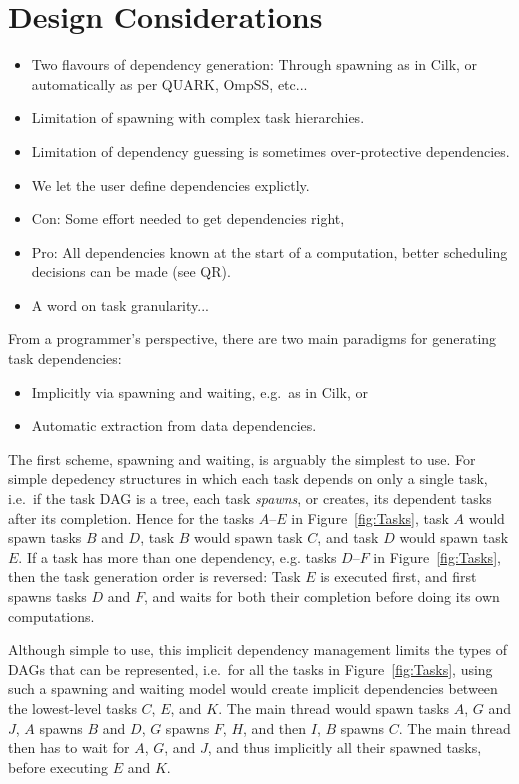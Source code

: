 \documentclass[preprint]{elsarticle}
\newcommand{\fig}[1]
    {Figure~\ref{fig:#1}}
\begin{document}
\section{Design Considerations}

\begin{itemize}
  \item Two flavours of dependency generation: Through spawning as in Cilk,
    or automatically as per QUARK, OmpSS, etc...
  \item Limitation of spawning with complex task hierarchies.
  \item Limitation of dependency guessing is sometimes over-protective dependencies.
  \item We let the user define dependencies explictly.
  \item Con: Some effort needed to get dependencies right,
  \item Pro: All dependencies known at the start of a computation, better
    scheduling decisions can be made (see QR).
  \item A word on task granularity...
\end{itemize}

From a programmer's perspective, there are two main paradigms for generating
task dependencies:
\begin{itemize}
  \item Implicitly via spawning and waiting, e.g.~as in Cilk, or
  \item Automatic extraction from data dependencies.
\end{itemize}

The first scheme, spawning and waiting, is arguably the simplest to
use.
For simple depedency structures in which each task depends on only a
single task, i.e.~if the task DAG is a tree, each task {\em spawns}, or
creates, its dependent tasks after its completion.
Hence for the tasks $A$--$E$ in \fig{Tasks}, task $A$ would spawn
tasks $B$ and $D$, task $B$ would spawn task $C$, and task $D$ would
spawn task $E$.
If a task has more than one dependency, e.g. tasks $D$--$F$ in \fig{Tasks},
then the task generation order is reversed: Task $E$ is executed first,
and first spawns tasks $D$ and $F$, and waits for both their completion
before doing its own computations.

Although simple to use, this implicit dependency management
limits the types of DAGs that can be represented, i.e.~for
all the tasks in \fig{Tasks}, using such a spawning and waiting model
would create implicit dependencies between the lowest-level
tasks $C$, $E$, and $K$.
The main thread would spawn tasks $A$, $G$ and $J$, $A$ spawns $B$ and $D$,
$G$ spawns $F$, $H$, and then $I$, $B$ spawns $C$.
The main thread then has to wait for $A$, $G$, and $J$,
and thus implicitly all their spawned tasks, before executing
$E$ and $K$.
\end{document}
